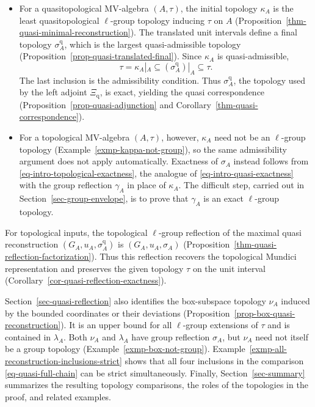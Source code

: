 \documentclass[preprint,3p]{elsarticle}
\theoremstyle{plain}
\theoremstyle{definition}
\numberwithin{equation}{section}
\begin{document}
\begin{itemize}
\item For a quasitopological MV-algebra $(A,\tau)$, the initial topology
$\kappa_A$ is the least quasitopological $\ell$-group topology
inducing $\tau$ on $A$
(Proposition~\ref{thm-quasi-minimal-reconstruction}).
The translated unit intervals define a final topology
$\sigma_A^{\mathrm q}$, which is the largest quasi-admissible topology
(Proposition~\ref{prop-quasi-translated-final}).
Since $\kappa_A$ is quasi-admissible,
\begin{equation}
\label{eq-intro-quasi-exactness}
 \tau=\kappa_A|_A
 \subseteq(\sigma_A^{\mathrm q})|_A\subseteq\tau.
\end{equation}
The last inclusion is the admissibility condition.
Thus $\sigma_A^{\mathrm q}$, the topology used by the left adjoint
$\Xi_{\mathrm q}$, is exact, yielding the quasi correspondence
(Proposition~\ref{prop-quasi-adjunction} and
Corollary~\ref{thm-quasi-correspondence}).

\item For a topological MV-algebra $(A,\tau)$, however,
$\kappa_A$ need not be an $\ell$-group topology
(Example~\ref{exmp-kappa-not-group}),
so the same admissibility argument does not apply automatically.
Exactness of $\sigma_A$ instead follows from
\eqref{eq-intro-topological-exactness}, the analogue of
\eqref{eq-intro-quasi-exactness} with the group reflection
$\gamma_A$ in place of $\kappa_A$.
The difficult step, carried out in Section~\ref{sec-group-envelope},
is to prove that $\gamma_A$ is an exact $\ell$-group topology.
\end{itemize}

For topological inputs, the topological $\ell$-group reflection
of the maximal quasi reconstruction $(G_A,u_A,\sigma_A^{\mathrm q})$
is $(G_A,u_A,\sigma_A)$
(Proposition~\ref{thm-quasi-reflection-factorization}).
Thus this reflection recovers the topological Mundici representation
and preserves the given topology $\tau$ on the unit interval
(Corollary~\ref{cor-quasi-reflection-exactness}).

Section~\ref{sec-quasi-reflection} also identifies the box-subspace topology
$\nu_A$ induced by the bounded coordinates or their deviations
(Proposition~\ref{prop-box-quasi-reconstruction}).
It is an upper bound for all $\ell$-group extensions of $\tau$ and
is contained in $\lambda_A$.
Both $\nu_A$ and $\lambda_A$ have group reflection $\sigma_A$,
but $\nu_A$ need not itself be a group topology
(Example~\ref{exmp-box-not-group}).
Example~\ref{exmp-all-reconstruction-inclusions-strict} shows that
all four inclusions in the comparison
\eqref{eq-quasi-full-chain} can be strict simultaneously.
Finally, Section~\ref{sec-summary} summarizes the resulting topology
comparisons, the roles of the topologies in the proof, and
related examples.
\end{document}
